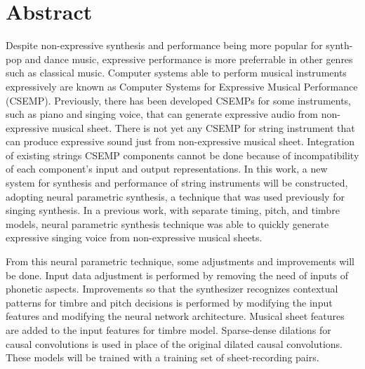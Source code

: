 \clearpage
\chapter*{Abstract}

Despite non-expressive synthesis and performance being more popular for synth-pop and dance music, expressive performance is more preferrable in other genres such as classical music. Computer systems able to perform musical instruments expressively are known as Computer Systems for Expressive Musical Performance (CSEMP). Previously, there has been developed CSEMPs for some instruments, such as piano and singing voice, that can generate expressive audio from non-expressive musical sheet. There is not yet any CSEMP for string instrument that can produce expressive sound just from non-expressive musical sheet. Integration of existing strings CSEMP components cannot be done because of incompatibility of each component's input and output representations. In this work, a new system for synthesis and performance of string instruments will be constructed, adopting neural parametric synthesis, a technique that was used previously for singing synthesis. In a previous work, with separate timing, pitch, and timbre models, neural parametric synthesis technique was able to quickly generate expressive singing voice from non-expressive musical sheets.

From this neural parametric technique, some adjustments and improvements will be done. Input data adjustment is performed by removing the need of inputs of phonetic aspects. Improvements so that the synthesizer recognizes contextual patterns for timbre and pitch decisions is performed by modifying the input features and modifying the neural network architecture. Musical sheet features are added to the input features for timbre model. Sparse-dense dilations for causal convolutions is used in place of the original dilated causal convolutions. These models will be trained with a training set of sheet-recording pairs.

\clearpage